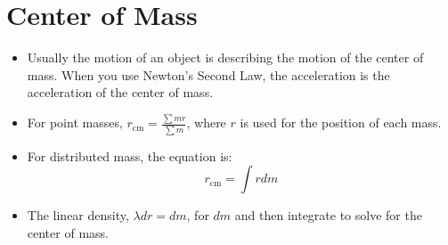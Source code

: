 \documentclass{article}
\begin{document}
\section{Center of Mass}
\begin{itemize}
    \item Usually the motion of an object is describing the motion of the center of mass. When you use Newton's Second Law, the acceleration is the acceleration of the center of mass.
    \item For point masses, $r_{\text{cm}} = \frac{\sum mr}{\sum m}$, where $r$ is used for the position of each mass.
    \item For distributed mass, the equation is:
    \begin{equation*}
        r_{\text{cm}}=\int rdm
    \end{equation*}
    \item The linear density, $\lambda dr=dm$, for $dm$ and then integrate to solve for the center of mass.
\end{itemize}
\end{document}
